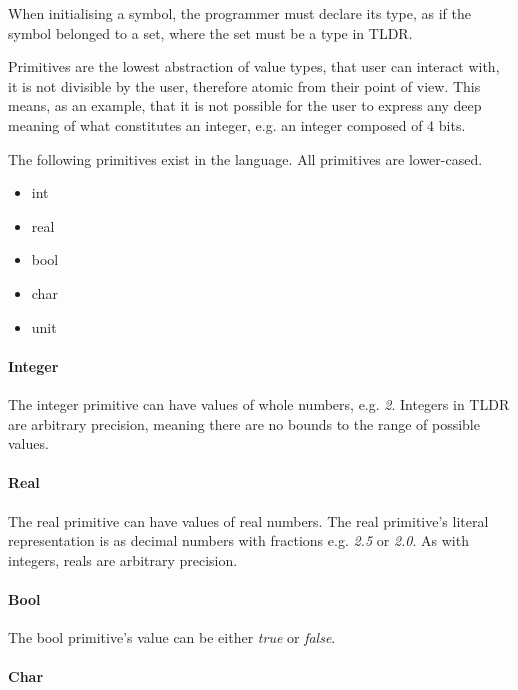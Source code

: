 When initialising a symbol, the programmer must declare its type, as if the symbol belonged to a set, where the set must be a type in TLDR.

Primitives are the lowest abstraction of value types, that user can interact with, it is not divisible by the user, therefore atomic from their point of view. This means, as an example, that it is not possible for the user to express any deep meaning of what constitutes an integer, e.g. an integer composed of 4 bits.

The following primitives exist in the language. All primitives are lower-cased.

\begin{itemize}
  \item int
  \item real
  \item bool
  \item char
  \item unit
\end{itemize}

\paragraph{Integer}
\label{subsubsec:int}

The integer primitive can have values of whole numbers, e.g. \emph{2}. Integers in TLDR are arbitrary precision, meaning there are no bounds to the range of possible values.

\paragraph{Real}
\label{subsubsec:real}

The real primitive can have values of real numbers. The real primitive's literal representation is as decimal numbers with fractions e.g. \emph{2.5} or \emph{2.0}. As with integers, reals are arbitrary precision.

\paragraph{Bool}
\label{subsubsec:bool}

The bool primitive's value can be either \emph{true} or \emph{false}.

\paragraph{Char}
\label{sec:char}

